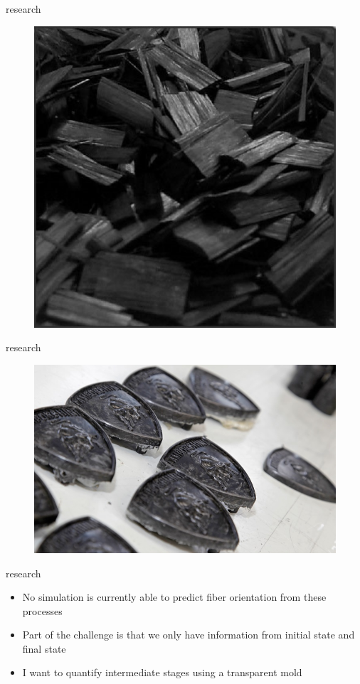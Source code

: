 \documentclass[10pt]{beamer}
\begin{document}
\begin{frame}{research}
\begin{figure}
\centering
\includegraphics[width=0.6\linewidth]{./Formosa_Chopped_Carbon_Fiber_CSc_bw}
\label{fig:Formosa_Chopped_Carbon_Fiber_CSc_bw}
\end{figure}

\end{frame}

\begin{frame}{research}
\begin{figure}
\centering
\includegraphics[width=0.8\linewidth]{./lamborghini-chopped-fiber-badges-rough}
\label{fig:lamborghini-chopped-fiber-badges-rough}
\end{figure}

\end{frame}

\begin{frame}{research}
\begin{itemize}
\item No simulation is currently able to predict fiber orientation from these processes
\item Part of the challenge is that we only have information from initial state and final state
\item I want to quantify intermediate stages using a transparent mold
\end{itemize}
\end{frame}
\end{document}
